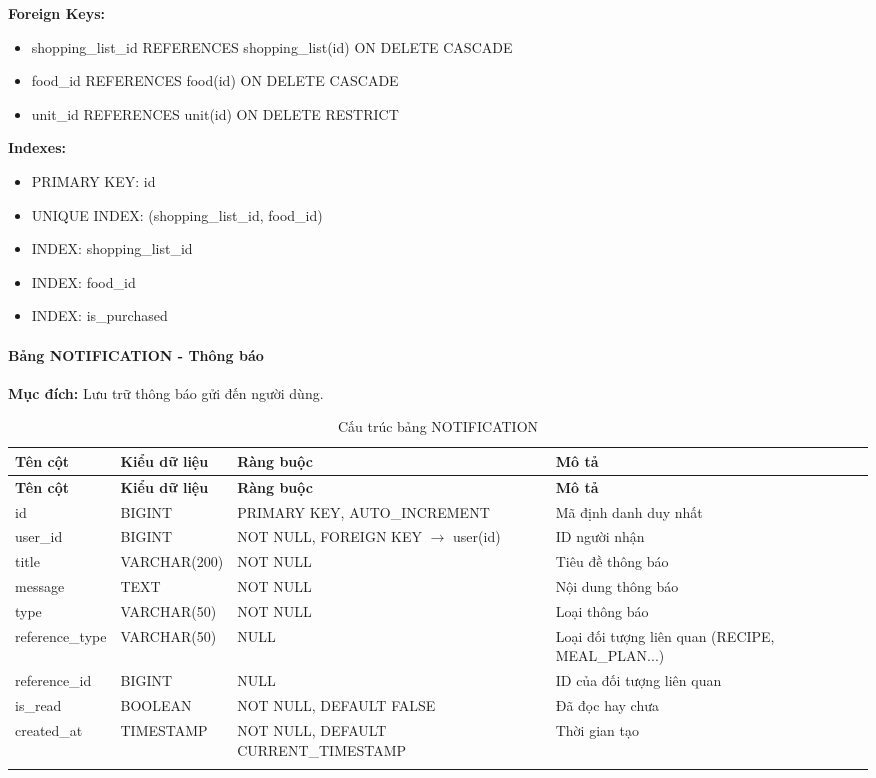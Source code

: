 \textbf{Foreign Keys:}
\begin{itemize}
    \item shopping\_list\_id REFERENCES shopping\_list(id) ON DELETE CASCADE
    \item food\_id REFERENCES food(id) ON DELETE CASCADE
    \item unit\_id REFERENCES unit(id) ON DELETE RESTRICT
\end{itemize}

\textbf{Indexes:}
\begin{itemize}
    \item PRIMARY KEY: id
    \item UNIQUE INDEX: (shopping\_list\_id, food\_id)
    \item INDEX: shopping\_list\_id
    \item INDEX: food\_id
    \item INDEX: is\_purchased
\end{itemize}

\paragraph{Bảng NOTIFICATION - Thông báo}
\textbf{Mục đích:} Lưu trữ thông báo gửi đến người dùng.

\small
\begin{longtable}{|>{\raggedright\arraybackslash}p{3.5cm}|>{\raggedright\arraybackslash}p{3cm}|>{\raggedright\arraybackslash}p{4cm}|>{\raggedright\arraybackslash}p{4cm}|}
\hline
\textbf{Tên cột} & \textbf{Kiểu dữ liệu} & \textbf{Ràng buộc} & \textbf{Mô tả} \\
\hline
\endfirsthead
\hline
\textbf{Tên cột} & \textbf{Kiểu dữ liệu} & \textbf{Ràng buộc} & \textbf{Mô tả} \\
\hline
\endhead
id & BIGINT & PRIMARY KEY, AUTO\_INCREMENT & Mã định danh duy nhất \\
\hline
user\_id & BIGINT & NOT NULL, FOREIGN KEY $\rightarrow$ user(id) & ID người nhận \\
\hline
title & VARCHAR(200) & NOT NULL & Tiêu đề thông báo \\
\hline
message & TEXT & NOT NULL & Nội dung thông báo \\
\hline
type & VARCHAR(50) & NOT NULL & Loại thông báo \\
\hline
reference\_type & VARCHAR(50) & NULL & Loại đối tượng liên quan (RECIPE, MEAL\_PLAN...) \\
\hline
reference\_id & BIGINT & NULL & ID của đối tượng liên quan \\
\hline
is\_read & BOOLEAN & NOT NULL, DEFAULT FALSE & Đã đọc hay chưa \\
\hline
created\_at & TIMESTAMP & NOT NULL, DEFAULT CURRENT\_TIMESTAMP & Thời gian tạo \\
\hline
\caption{Cấu trúc bảng NOTIFICATION}
\end{longtable}

